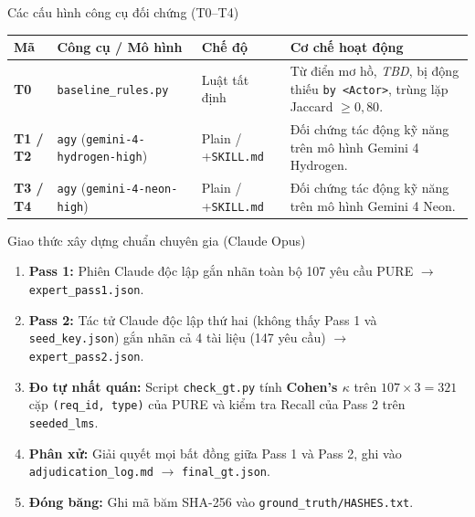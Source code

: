 \documentclass[aspectratio=169,10pt]{beamer}
\begin{document}
\begin{frame}{Các cấu hình công cụ đối chứng (T0--T4)}
  \footnotesize
  \begin{tabular}{lllp{4.9cm}}
    \toprule
    \textbf{Mã} & \textbf{Công cụ / Mô hình} & \textbf{Chế độ} & \textbf{Cơ chế hoạt động} \\
    \midrule
    \textbf{T0} & \texttt{baseline\_rules.py} & Luật tất định & Từ điển mơ hồ, \textit{TBD}, bị động thiếu \texttt{by <Actor>}, trùng lặp Jaccard $\ge 0{,}80$. \\
    \textbf{T1 / T2} & \texttt{agy} (\texttt{gemini-4-hydrogen-high}) & Plain / +\texttt{SKILL.md} & Đối chứng tác động kỹ năng trên mô hình Gemini 4 Hydrogen. \\
    \textbf{T3 / T4} & \texttt{agy} (\texttt{gemini-4-neon-high}) & Plain / +\texttt{SKILL.md} & Đối chứng tác động kỹ năng trên mô hình Gemini 4 Neon. \\
    \bottomrule
  \end{tabular}
\end{frame}

\begin{frame}{Giao thức xây dựng chuẩn chuyên gia (Claude Opus)}
  \begin{enumerate}
    \item \textbf{Pass 1:} Phiên Claude độc lập gắn nhãn toàn bộ 107 yêu cầu PURE $\rightarrow$ \texttt{expert\_pass1.json}.
    \item \textbf{Pass 2:} Tác tử Claude độc lập thứ hai (không thấy Pass 1 và \texttt{seed\_key.json}) gắn nhãn cả 4 tài liệu (147 yêu cầu) $\rightarrow$ \texttt{expert\_pass2.json}.
    \item \textbf{Đo tự nhất quán:} Script \texttt{check\_gt.py} tính \textbf{Cohen's $\kappa$} trên $107 \times 3 = 321$ cặp \texttt{(req\_id, type)} của PURE và kiểm tra Recall của Pass 2 trên \texttt{seeded\_lms}.
    \item \textbf{Phân xử:} Giải quyết mọi bất đồng giữa Pass 1 và Pass 2, ghi vào \texttt{adjudication\_log.md} $\rightarrow$ \texttt{final\_gt.json}.
    \item \textbf{Đóng băng:} Ghi mã băm SHA-256 vào \texttt{ground\_truth/HASHES.txt}.
  \end{enumerate}
\end{frame}
\end{document}
